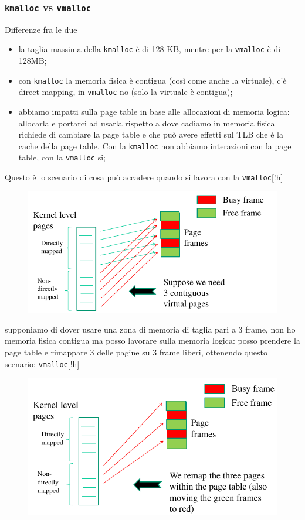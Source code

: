 \documentclass[12pt, oneside]{extbook}
\begin{document}
\subsubsection{\texttt{kmalloc} vs \texttt{vmalloc}}
Differenze fra le due
\begin{itemize}
\item la taglia massima della \texttt{kmalloc} è di 128 KB, mentre per la \texttt{vmalloc} è di 128MB;
\item con \texttt{kmalloc} la memoria fisica è contigua (così come anche la virtuale), c'è direct mapping, in \texttt{vmalloc} no (solo la virtuale è contigua);
\item abbiamo impatti sulla page table in base alle allocazioni di memoria logica: allocarla e portarci ad usarla rispetto a dove cadiamo in memoria fisica richiede di cambiare la page table e che può avere effetti sul TLB che è la cache della page table. Con la \texttt{kmalloc} non abbiamo interazioni con la page table, con la \texttt{vmalloc} si;
\end{itemize}
Questo è lo scenario di cosa può accadere quando si lavora con la \texttt{vmalloc}[!h]
\begin{figure}
	\includegraphics[scale=0.3]{immagini/vmalloc_1.png}
\end{figure}
supponiamo di dover usare una zona di memoria di taglia pari a 3 frame, non ho memoria fisica contigua ma posso lavorare sulla memoria logica: posso prendere la page table e rimappare 3 delle pagine su 3 frame liberi, ottenendo questo scenario:
\texttt{vmalloc}[!h]
\begin{figure}
	\includegraphics[scale=0.3]{immagini/vmalloc_2.png}
\end{figure}
\end{document}
